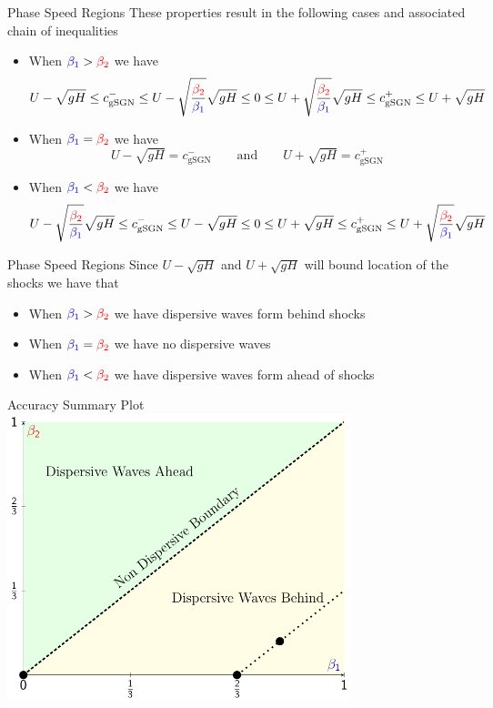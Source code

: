 \documentclass[pdf]{beamer}
\begin{document}
\begin{frame}{Phase Speed Regions }
These properties result in the following cases and associated chain of inequalities
\begin{itemize}
\item When ${\color{blue}\beta_1 } > {\color{red}\beta_2 }$ we have
{\footnotesize  \[U - \sqrt{gH}\le   c^-_{\text{gSGN}} \le  U - \sqrt{\frac{{\color{red}\beta_2 }}{{\color{blue}\beta_1 }}} \sqrt{gH} \le 0 \le  U + \sqrt{\frac{{\color{red}\beta_2 }}{{\color{blue}\beta_1 }}} \sqrt{gH} \le c^+_{\text{gSGN}} \le U + \sqrt{gH} \]}
\item When ${\color{blue}\beta_1 } = {\color{red}\beta_2 }$ we have
\[U - \sqrt{gH} =   c^-_{\text{gSGN}} \quad \quad \text{and} \quad \quad  U + \sqrt{gH} =   c^+_{\text{gSGN}}\]
\item When ${\color{blue}\beta_1 } < {\color{red}\beta_2 }$ we have
{\footnotesize \[U - \sqrt{\frac{{\color{red}\beta_2 }}{{\color{blue}\beta_1 }}} \sqrt{gH}\le   c^-_{\text{gSGN}} \le  U - \sqrt{gH} \le 0 \le  U + \sqrt{gH} \le c^+_{\text{gSGN}} \le U +  \sqrt{\frac{{\color{red}\beta_2 }}{{\color{blue}\beta_1 }}} \sqrt{gH}  \]}
\end{itemize}
\end{frame}


\begin{frame}{Phase Speed Regions }
Since $U - \sqrt{gH} $  and $U +  \sqrt{gH} $ will bound location of the shocks we have that
\begin{itemize}
	\item When ${\color{blue}\beta_1 } > {\color{red}\beta_2 }$ we have dispersive waves form behind shocks
	\item When ${\color{blue}\beta_1 } = {\color{red}\beta_2 }$ we have no dispersive waves
	\item When ${\color{blue}\beta_1 } < {\color{red}\beta_2 }$ we have dispersive waves form ahead of shocks 
\end{itemize}
\end{frame}
\begin{frame}{Accuracy Summary Plot}
\centering
\includegraphics[width=0.75\textwidth]{./Pics/Tex/Explanatory/RegionsPlot/AccuracySummaryWithRegions.pdf}
\end{frame}
\end{document}
